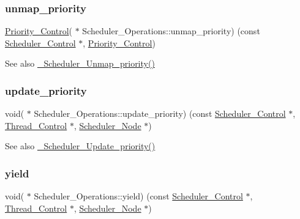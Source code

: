 \subsubsection{\texorpdfstring{unmap\_priority}{unmap\_priority}}
{\footnotesize\ttfamily \mbox{\hyperlink{group__RTEMSScorePriority_ga59d02b58072d31a9a1cfe644557aefe2}{Priority\+\_\+\+Control}}( $\ast$ Scheduler\+\_\+\+Operations\+::unmap\+\_\+priority) (const \mbox{\hyperlink{struct__Scheduler__Control}{Scheduler\+\_\+\+Control}} $\ast$, \mbox{\hyperlink{group__RTEMSScorePriority_ga59d02b58072d31a9a1cfe644557aefe2}{Priority\+\_\+\+Control}})}

\begin{DoxySeeAlso}{See also}
\mbox{\hyperlink{group__RTEMSScoreScheduler_gaa2f56f77ed86e3d02527742f917fcd0c}{\+\_\+\+Scheduler\+\_\+\+Unmap\+\_\+priority()}} 
\end{DoxySeeAlso}
\mbox{\label{structScheduler__Operations_a2a15895ba197e2a417a367ad329f33fe}} 
\subsubsection{\texorpdfstring{update\_priority}{update\_priority}}
{\footnotesize\ttfamily void( $\ast$ Scheduler\+\_\+\+Operations\+::update\+\_\+priority) (const \mbox{\hyperlink{struct__Scheduler__Control}{Scheduler\+\_\+\+Control}} $\ast$, \mbox{\hyperlink{struct__Thread__Control}{Thread\+\_\+\+Control}} $\ast$, \mbox{\hyperlink{structScheduler__Node}{Scheduler\+\_\+\+Node}} $\ast$)}

\begin{DoxySeeAlso}{See also}
\mbox{\hyperlink{group__RTEMSScoreScheduler_ga7fdbd807dbde0152b93a9ebc59f69e5d}{\+\_\+\+Scheduler\+\_\+\+Update\+\_\+priority()}} 
\end{DoxySeeAlso}
\mbox{\label{structScheduler__Operations_ad2496c11920c57d1ec323f0d1bd79977}} 
\subsubsection{\texorpdfstring{yield}{yield}}
{\footnotesize\ttfamily void( $\ast$ Scheduler\+\_\+\+Operations\+::yield) (const \mbox{\hyperlink{struct__Scheduler__Control}{Scheduler\+\_\+\+Control}} $\ast$, \mbox{\hyperlink{struct__Thread__Control}{Thread\+\_\+\+Control}} $\ast$, \mbox{\hyperlink{structScheduler__Node}{Scheduler\+\_\+\+Node}} $\ast$)}

